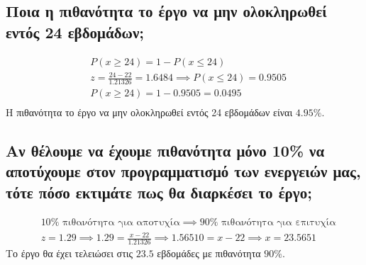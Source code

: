 \documentclass[12pt]{turabian-researchpaper}
\begin{document}
\subsection{Ποια η πιθανότητα το έργο να μην ολοκληρωθεί εντός 24 εβδομάδων;}
\begin{equation*}
    \begin{aligned}
         & P(x \geq 24) = 1 - P(x \leq 24)                                   \\
         & z = \frac{24-22}{1.21326} = 1.6484 \implies P(x \leq 24) = 0.9505 \\
         & P(x \geq 24) = 1 - 0.9505 = 0.0495                                \\
    \end{aligned}
\end{equation*}
Η πιθανότητα το έργο να μην ολοκληρωθεί εντός 24 εβδομάδων είναι $ 4.95 \% $.

\subsection{Αν θέλουμε να έχουμε πιθανότητα μόνο 10\% να αποτύχουμε στον προγραμματισμό των ενεργειών μας, τότε πόσο εκτιμάτε πως θα διαρκέσει το έργο;}
\begin{equation*}
    \begin{aligned}
         & 10\% \text{ πιθανότητα για αποτυχία} \implies 90\% \text{ πιθανότητα για επιτυχία} \\
         & z = 1.29 \implies 1.29 = \frac{x - 22}{1.21326} \implies 1.56510 = x - 22 \implies x = 23.5651
    \end{aligned}
\end{equation*}
Το έργο θα έχει τελειώσει στις $ 23.5 $ εβδομάδες με πιθανότητα $ 90 \% $.
\end{document}
